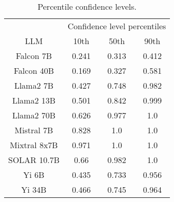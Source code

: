 \begin{table*}
\centering
\begin{tabular}{c|c|c|c}
& \multicolumn{3}{c}{Confidence level percentiles} \\ 
LLM & 10th & 50th & 90th\\ \hline
Falcon 7B & 0.241 & 0.313 & 0.412\\
Falcon 40B & 0.169 & 0.327 & 0.581\\
Llama2 7B & 0.427 & 0.748 & 0.982\\
Llama2 13B & 0.501 & 0.842 & 0.999\\
Llama2 70B & 0.626 & 0.977 & 1.0\\
Mistral 7B & 0.828 & 1.0 & 1.0\\
Mixtral 8x7B & 0.971 & 1.0 & 1.0\\
SOLAR 10.7B & 0.66 & 0.982 & 1.0\\
Yi 6B & 0.435 & 0.733 & 0.956\\
Yi 34B & 0.466 & 0.745 & 0.964\\
\hline
\end{tabular}
\caption{Percentile confidence levels.}
\label{tab:percentile_conf}
\end{table*}
